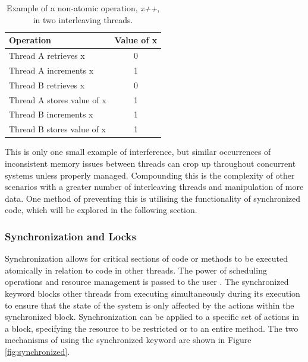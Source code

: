 \documentclass[a4paper,12pt]{article}
\begin{document}
\begin{table}[]
    \centering
    \begin{tabular}{||l c||} 
     \hline
     Operation & Value of x  \\ 
     \hline\hline
     Thread A retrieves x & 0 \\ 
     \hline
     Thread A increments x & 1  \\
     \hline
     Thread B retrieves x & 0 \\
     \hline
     Thread A stores value of x & 1 \\
     \hline
     Thread B increments x & 1 \\  
     \hline
     Thread B stores value of x & 1 \\
     \hline
    \end{tabular}
    \caption{Example of a non-atomic operation, \textit{x++}, in two interleaving threads.}
    \label{table:non-atomic}
\end{table}

 

This is only one small example of interference, but similar occurrences of inconsistent memory issues between threads can crop up throughout concurrent systems unless properly managed. Compounding this is the complexity of other scenarios with a greater number of interleaving threads and manipulation of more data. One method of preventing this is utilising the functionality of synchronized code, which will be explored in the following section.


\subsubsection{Synchronization and Locks}
    
Synchronization allows for critical sections of code or methods to be executed atomically in relation to code in other threads. The power of scheduling operations and resource management is passed to the user \citep{silberschatz13}. The synchronized keyword blocks other threads from executing simultaneously during its execution to ensure that the state of the system is only affected by the actions within the synchronized block. Synchronization can be applied to a specific set of actions in a block, specifying the resource to be restricted or to an entire method. The two mechanisms of using the synchronized keyword are shown in Figure \ref{fig:synchronized}. 
\end{document}
